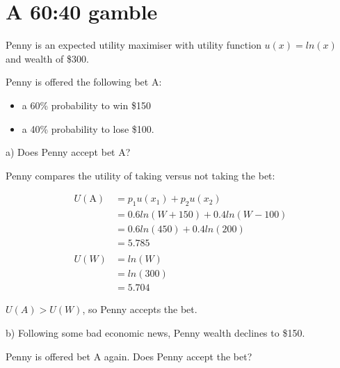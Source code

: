 \documentclass[
  letterpaper,
  DIV=11,
  numbers=noendperiod]{scrreprt}
\providecommand{\tightlist}{%
  \setlength{\itemsep}{0pt}\setlength{\parskip}{0pt}}\usepackage{longtable,booktabs,array}
\begin{document}
\hypertarget{a-6040-gamble}{%
\section{A 60:40 gamble}\label{a-6040-gamble}}

Penny is an expected utility maximiser with utility function
\(u(x)=ln(x)\) and wealth of \$300.

Penny is offered the following bet A:

\begin{itemize}
\tightlist
\item
  a 60\% probability to win \$150
\item
  a 40\% probability to lose \$100.
\end{itemize}

a) Does Penny accept bet A?

\begin{tcolorbox}[enhanced jigsaw, title=\textcolor{quarto-callout-tip-color}{\faLightbulb}\hspace{0.5em}{Answer}, toprule=.15mm, colback=white, breakable, titlerule=0mm, colframe=quarto-callout-tip-color-frame, coltitle=black, opacityback=0, rightrule=.15mm, colbacktitle=quarto-callout-tip-color!10!white, bottomtitle=1mm, opacitybacktitle=0.6, arc=.35mm, bottomrule=.15mm, toptitle=1mm, leftrule=.75mm, left=2mm]

Penny compares the utility of taking versus not taking the bet:

\begin{align*}
U(\text{A})&=p_1u(x_1)+p_2u(x_2) \\
&=0.6ln(W+150)+0.4ln(W-100) \\
&=0.6ln(450)+0.4ln(200) \\
&=5.785 \\
\\
U(W)&=ln(W) \\
&=ln(300) \\
&=5.704
\end{align*}

\(U(A)>U(W)\), so Penny accepts the bet.

\end{tcolorbox}

b) Following some bad economic news, Penny wealth declines to \$150.

Penny is offered bet A again. Does Penny accept the bet?
\end{document}
